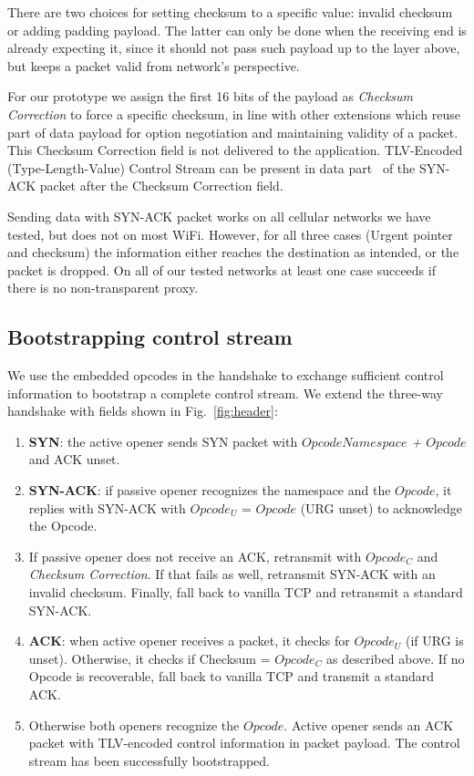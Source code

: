 \documentclass{sig-alternate-10pt}
\begin{document}
There are two choices for setting checksum to a specific value: invalid checksum or adding padding payload. The latter can only be done when the receiving end is already expecting it, since it should not pass such payload up to the layer above, but keeps a packet valid from network's perspective.

For our prototype we assign the first 16 bits of the payload as \emph{Checksum Correction} to force a specific checksum, in line with other extensions which reuse part of data payload for option negotiation and maintaining validity of a packet. This Checksum Correction field is not delivered to the application. TLV-Encoded (Type-Length-Value) Control Stream can be present in data part~\cite{Bonaventure:wx} of the SYN-ACK packet after the Checksum Correction field.

Sending data with SYN-ACK packet works on all cellular networks we have tested, but does not on most WiFi. However, for all three cases (Urgent pointer and checksum) the information either reaches the destination as intended, or the packet is dropped. On all of our tested networks at least one case succeeds if there is no non-transparent proxy.

\subsection{Bootstrapping control stream}

We use the embedded opcodes in the handshake to exchange sufficient control information to bootstrap a complete control stream. We extend the three-way handshake with fields shown in Fig.~\ref{fig:header}:

\begin{enumerate}
\item \textbf{SYN}: the active opener sends SYN packet with \emph{$Opcode Namespace$ + $Opcode$} and ACK unset.
\item \textbf{SYN-ACK}: if passive opener recognizes the namespace and the $Opcode$, it replies with SYN-ACK with $Opcode_U$ = $Opcode$ (URG unset) to acknowledge the Opcode.
\item If passive opener does not receive an ACK, retransmit with $Opcode_C$ and \emph{Checksum Correction}. If that fails as well, retransmit SYN-ACK with an invalid checksum. Finally, fall back to vanilla TCP and retransmit a standard SYN-ACK.
\item \textbf{ACK}: when active opener receives a packet, it checks for $Opcode_U$ (if URG is unset). Otherwise, it checks if Checksum = $Opcode_C$ as described above. If no Opcode is recoverable, fall back to vanilla TCP and transmit a standard ACK.
\item Otherwise both openers recognize the $Opcode$. Active opener sends an ACK packet with TLV-encoded control information in packet payload. The control stream has been successfully bootstrapped.
\end{enumerate}
\end{document}
